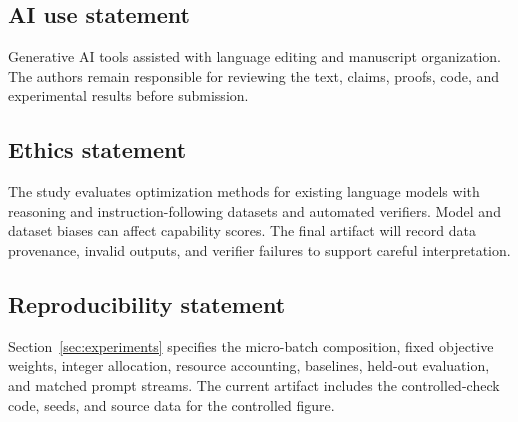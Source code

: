 \subsection*{AI use statement}

Generative AI tools assisted with language editing and manuscript organization.
The authors remain responsible for reviewing the text, claims, proofs, code,
and experimental results before submission.

\subsection*{Ethics statement}

The study evaluates optimization methods for existing language models with
reasoning and instruction-following datasets and automated verifiers. Model and
dataset biases can affect capability scores. The final artifact will record data
provenance, invalid outputs, and verifier failures to support careful
interpretation.

\subsection*{Reproducibility statement}

Section~\ref{sec:experiments} specifies the micro-batch composition, fixed
objective weights, integer allocation, resource accounting, baselines,
held-out evaluation, and matched prompt streams. The current artifact includes
the controlled-check code, seeds, and source data for the controlled figure.

